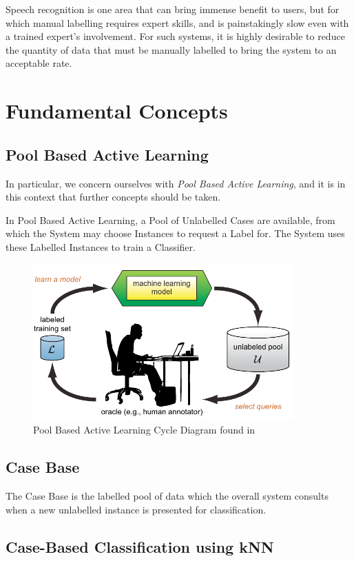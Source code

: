 \documentclass[a4paper,11pt]{report}
\begin{document}
Speech recognition is one area that can bring immense benefit to users, but for which manual labelling requires expert skills, and is painstakingly slow even with a trained expert's involvement. For such systems, it is highly desirable to reduce the quantity of data that must be manually labelled to bring the system to an acceptable rate.

\section{Fundamental Concepts}
\subsection{Pool Based Active Learning}
In particular, we concern ourselves with \emph{Pool Based Active Learning}, and it is in this context that further concepts should be taken.

In Pool Based Active Learning, a Pool of Unlabelled Cases are available, from which the System may choose Instances to request a Label for. The System uses these Labelled Instances to train a Classifier.

\begin{figure}[h!]
\includegraphics[width=10cm]{./Others/Settles2010PoolBasedImage}
\caption{Pool Based Active Learning Cycle Diagram found in \citep{Settles2010}}
\end{figure}

\subsection{Case Base}
The Case Base is the labelled pool of data which the overall system consults when a new unlabelled instance is presented for classification.

\subsection{Case-Based Classification using kNN}
\end{document}
